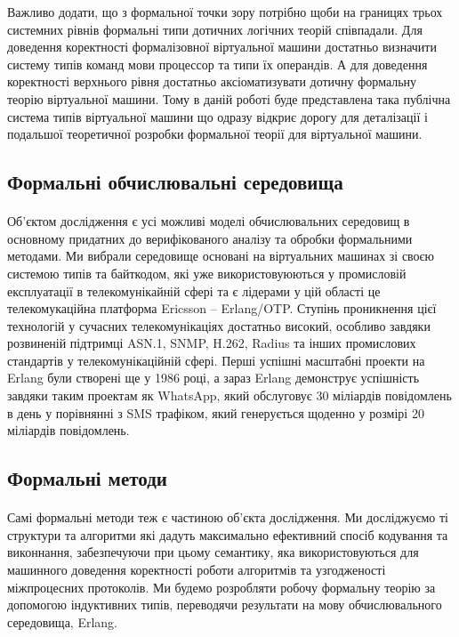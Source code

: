 \documentclass[11pt,oneside]{article}
\begin{document}
   Важливо додати, що з формальної точки зору потрібно щоби на границях
   трьох системних рівнів формальні типи дотичних логічних теорій співпадали.
   Для доведення коректності формалізовної віртуальної машини достатньо
   визначити систему типів команд мови процессор та типи їх операндів. А для
   доведення коректності верхнього рівня достатньо аксіоматизувати дотичну
   формальну теорію віртуальної машини. Тому в даній роботі буде представлена
   така публічна система типів віртуальної машини що одразу відкриє дорогу
   для деталізації і подальшої теоретичної розробки формальної теорії для віртуальної машини.

\subsection{Формальні обчислювальні середовища}

   \paragraph{}
   Об’єктом дослідження є усі можливі моделі обчислювальних середовищ в основному придатних
   до верифікованого аналізу та обробки формальними методами. Ми вибрали середовище
   основані на віртуальних машинах зі своєю системою типів та байткодом, які уже
   використовуюються у промисловій експлуатації в телекомунікайній сфері та є лідерами
   у цій області це телекомукаційна платформа Ericsson -- Erlang/OTP. Ступінь проникнення
   цієї технологій у сучасних телекомунікаціях достатньо високий, особливо завдяки
   розвиненій підтримці ASN.1, SNMP, H.262, Radius та інших промислових стандартів
   у телекомунікаційній сфері. Перші успішні масштабні проекти на Erlang були створені ще у
   1986 році, а зараз Erlang демонструє успішність завдяки таким проектам як WhatsApp, який
   обслуговує 30 міліардів повідомлень в день у порівнянні з SMS трафіком,
   який генерується щоденно у розмірі 20 міліардів повідомлень.

\newpage
\subsection*{Формальні методи}

   \paragraph{}
   Самі формальні методи теж є частиною об’єкта дослідження. Ми досліджуємо ті структури
   та алгоритми які дадуть максимально ефективний спосіб кодування та виконнання,
   забезпечуючи при цьому семантику, яка використовуються для машинного доведення
   коректності роботи алгоритмів та узгодженості міжпроцесних протоколів.
   Ми будемо розробляти робочу формальну теорію за допомогою індуктивних типів,
   переводячи результати на мову обчислювального середовища, Erlang.
\end{document}
